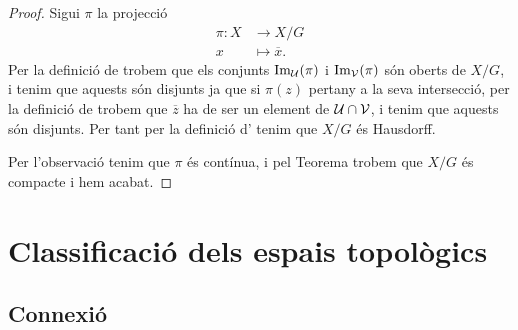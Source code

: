 \documentclass[../Apunts.tex]{subfiles}
\begin{document}
\begin{theorem}
\begin{proof}
			Sigui \(\pi\) la projecció
			\begin{align*}
				\pi\colon X&\longrightarrow X/G \\
				x&\longmapsto\overline{x}.
			\end{align*}
			Per la definició de  trobem que els conjunts \(\operatorname{Im}_{\mathcal{U}}(\pi)\) i \(\operatorname{Im}_{\mathcal{V}}(\pi)\) són oberts de \(X/G\), i tenim que aquests són disjunts ja que si \(\pi(z)\) pertany a la seva intersecció, per la definició de  trobem que \(\overline{z}\) ha de ser un element de \(\mathcal{U}\cap\mathcal{V}\), i tenim que aquests són disjunts. Per tant per la definició d' tenim que \(X/G\) és Hausdorff.
			
			Per l'observació  tenim que \(\pi\) és contínua, i pel Teorema  trobem que \(X/G\) és compacte i hem acabat.
		\end{proof}
	\end{theorem}
	\chapter{Classificació dels espais topològics}
	\section{Connexió}
\end{document}
